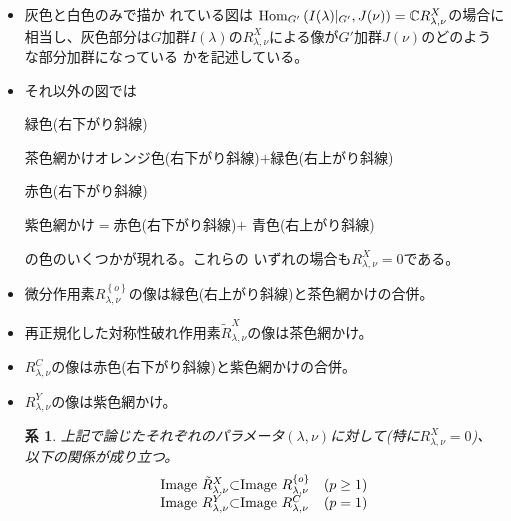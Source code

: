 \documentclass[12pt]{article} %
\newcommand{\Hom}{\mbox{\normalfont Hom}}
\newtheorem{corollary}[theorem]{系}
\theoremstyle{definition}
\theoremstyle{exampstyle} \newtheorem{examp}[theorem]{Theorem}
\newcommand{\IlambdaGprime}{I(\lambda)\kern-0.3em\mid_{G'}}
\newcommand{\SBO}{\Hom_{G'}\left(\IlambdaGprime,J(\nu) \right)}
\begin{document}
	\begin{itemize}
		\item 灰色と白色のみで描か
			れている図は
			$\SBO=\C R^X_{\lambda,\nu}$の場合に相当し、灰色部分は$G$加群$I(\lambda)$の$R_{\lambda,\nu}^X$に{よる}像が$G'$加群$J(\nu)$のどのような部分加群になっている
			かを記述している。
		\item それ以外の図では\begin{center}
				緑色(右下がり{斜}線)
			\end{center}\begin{center}
				茶色網かけオレンジ色(右下がり斜線)$+$緑色(右上がり斜線)
			\end{center}\begin{center}
				赤色(右下がり斜線)
			\end{center}\begin{center}
				紫色網かけ$=$赤色(右下がり斜線)$+$
			青色(右上がり斜線)
			\end{center}
			の色のいくつかが現れる。これらの
			いずれの場合も$R_{\lambda,\nu}^X=0$である。
		\item 微分作用素$R_{\lambda,\nu}^{ \left\{ o \right\}}$の像は緑色(右上がり斜線)と茶色網かけの合併。
		\item 再正規化した対称性破れ作用素$\tilde{R}_{\lambda,\nu}^X$の像は茶色網かけ。
		\item $R_{\lambda,\nu}^C$の像は赤色(右下がり斜線)と紫色網かけの合併。
		\item $R_{\lambda,\nu}^Y$の像は紫色網かけ。
			\begin{corollary}
				上記で論じたそれぞれのパラメータ$(\lambda,\nu)$に対して(特に$R_{\lambda,\nu}^X=0$)、以下の関係が成り立つ。
			\begin{equation*}
				\begin{array}[]{@{}l@{}l@{}ll@{}}
					\mbox{Image }\tilde{R}_{\lambda,\nu}^X&\subset&\mbox{Image }R_{\lambda,\nu}^{ \left\{ o \right\}}&(p\ge1)\\
					\mbox{Image }R_{\lambda,\nu}^Y&\subset&\mbox{Image }R_{\lambda,\nu}^C&(p=1)
				\end{array}
			\end{equation*}
			\end{corollary}
	\end{itemize}
\end{document}
